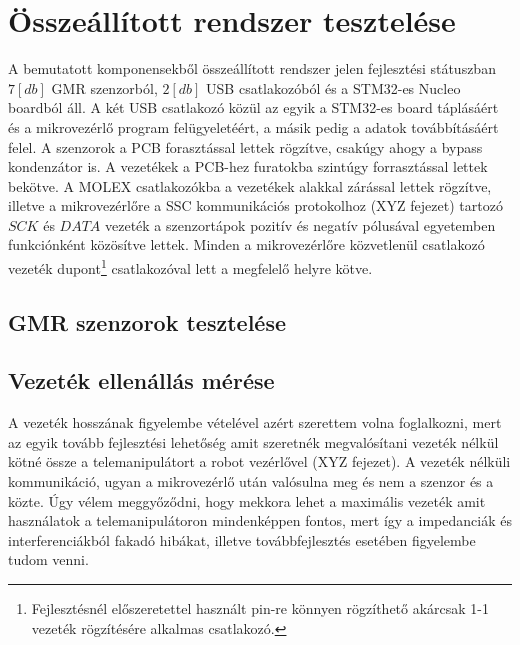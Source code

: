 \section{Összeállított rendszer tesztelése}

A bemutatott komponensekből összeállított rendszer jelen fejlesztési státuszban $7[db]$ GMR szenzorból, $2[db]$ USB csatlakozóból és a STM32-es Nucleo boardból áll. A két USB csatlakozó közül az egyik a STM32-es board táplásáért és a mikrovezérlő program felügyeletéért, a másik pedig a adatok továbbításáért felel. A szenzorok a PCB forasztással lettek rögzítve, csakúgy ahogy a bypass kondenzátor is. A vezetékek a PCB-hez furatokba szintúgy forrasztással lettek bekötve. A MOLEX csatlakozókba a vezetékek alakkal zárással lettek rögzítve, illetve a mikrovezérlőre a SSC kommunikációs protokolhoz (XYZ fejezet) tartozó $SCK$ és $DATA$ vezeték a szenzortápok pozitív és negatív pólusával egyetemben funkciónként közösítve lettek. Minden a mikrovezérlőre közvetlenül csatlakozó vezeték dupont\footnote{Fejlesztésnél előszeretettel használt pin-re könnyen rögzíthető akárcsak 1-1 vezeték rögzítésére alkalmas csatlakozó.} csatlakozóval lett a megfelelő helyre kötve.


\subsection{GMR szenzorok tesztelése}

\subsection{Vezeték ellenállás mérése}

A vezeték hosszának figyelembe vételével azért szerettem volna foglalkozni, mert az egyik tovább fejlesztési lehetőség amit szeretnék megvalósítani vezeték nélkül kötné össze a telemanipulátort a robot vezérlővel (XYZ fejezet). A vezeték nélküli kommunikáció, ugyan a mikrovezérlő után valósulna meg és nem a szenzor és a közte. Úgy vélem meggyőződni, hogy mekkora lehet a maximális vezeték amit használatok a telemanipulátoron mindenképpen fontos, mert így a impedanciák és interferenciákból fakadó hibákat, illetve továbbfejlesztés esetében figyelembe tudom venni.


